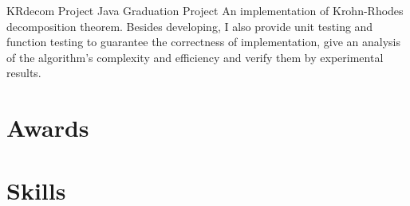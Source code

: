 \documentclass[11pt,a4paper]{moderncv}
\begin{document}
\vspace*{0.2\baselineskip}

{KRdecom Project}
{Java}
{Graduation Project}{}
{
An implementation of Krohn-Rhodes decomposition theorem. Besides developing, I also provide unit testing and function testing to guarantee the correctness of implementation, give an analysis of the algorithm's complexity and efficiency and verify them by experimental results.
}

\vspace*{0.2\baselineskip}


\section{Awards}

\section{Skills}



\end{document}
